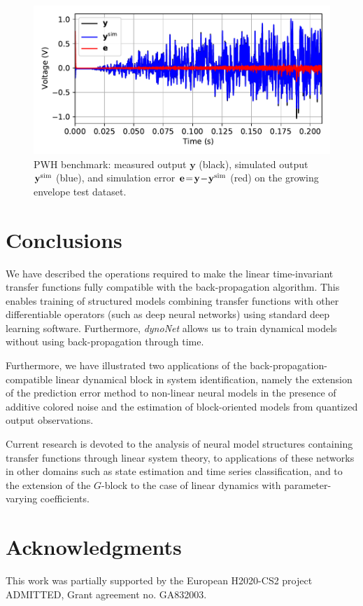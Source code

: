 \documentclass{article}
\newcommand{\tvec}[1]{\mathbf{#1}}
\newcommand{\simul}{{\rm sim}}
\begin{document}
\begin{figure}
 \centering
 \includegraphics[width=.8\textwidth]{fig/PWH_timetrace.pdf} \vspace{-0.5cm}
 \caption{PWH benchmark: measured output $\tvec{y}$ (black),  simulated output $\tvec{y}^{\simul}$ (blue), and simulation error $\tvec{e}\! =\! \tvec{y}\! -\! \tvec{y}^{\simul}$ (red) on the growing envelope test dataset.}
 \label{fig:PWH_timetrace}
\end{figure}


\section{Conclusions}
We have described  the operations required to make the linear time-invariant transfer functions fully compatible with the back-propagation algorithm.
This enables training of structured models combining transfer functions with other differentiable operators (such as deep neural networks) using standard deep learning software. Furthermore,  \emph{dynoNet}   allows us to train dynamical models without using back-propagation through time.

Furthermore, we have illustrated two  applications of the back-propagation-compatible linear dynamical block in system identification, namely the extension of the prediction error method to non-linear neural models in the presence of additive colored noise and the estimation of block-oriented models from quantized output observations.

Current  research is devoted to the analysis of neural model structures containing transfer functions through  linear system theory, to applications of these networks in other domains such as state estimation and time series classification, and to the extension of the $G$-block to the case of linear dynamics with parameter-varying coefficients.

\section*{Acknowledgments}
This work was partially supported by the European H2020-CS2 project ADMITTED, Grant agreement no. GA832003.



\end{document}
